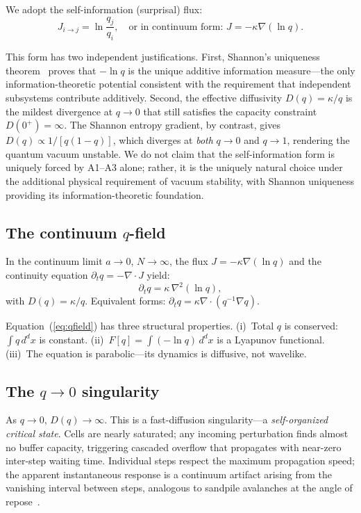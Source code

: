 \documentclass[12pt]{article}
\begin{document}
We adopt the self-information (surprisal) flux:
\begin{equation}
J_{i\to j} = \ln\frac{q_j}{q_i}, \quad \text{or in continuum form: } J = -\kappa\nabla(\ln q).
\end{equation}

This form has two independent justifications. First, Shannon's uniqueness theorem~\cite{Shannon1948} proves that $-\ln q$ is the unique additive information measure---the only information-theoretic potential consistent with the requirement that independent subsystems contribute additively. Second, the effective diffusivity $D(q)=\kappa/q$ is the mildest divergence at $q\to 0$ that still satisfies the capacity constraint $D(0^+)=\infty$. The Shannon entropy gradient, by contrast, gives $D(q)\propto 1/[q(1-q)]$, which diverges at \emph{both} $q\to 0$ and $q\to 1$, rendering the quantum vacuum unstable. We do not claim that the self-information form is uniquely forced by A1--A3 alone; rather, it is the uniquely natural choice under the additional physical requirement of vacuum stability, with Shannon uniqueness providing its information-theoretic foundation.

\subsection{The continuum $q$-field}

In the continuum limit $a\to 0$, $N\to\infty$, the flux $J=-\kappa\nabla(\ln q)$ and the continuity equation $\partial_t q = -\nabla\cdot J$ yield:
\begin{equation}
\boxed{\partial_t q = \kappa\,\nabla^2(\ln q)},
\label{eq:qfield}
\end{equation}
with $D(q)=\kappa/q$. Equivalent forms: $\partial_t q = \kappa\nabla\cdot(q^{-1}\nabla q)$.

Equation~(\ref{eq:qfield}) has three structural properties. (i)~Total $q$ is conserved: $\int q\,d^dx$ is constant. (ii)~$F[q]=\int(-\ln q)\,d^dx$ is a Lyapunov functional. (iii)~The equation is parabolic---its dynamics is diffusive, not wavelike.

\subsection{The $q\to 0$ singularity}

As $q\to 0$, $D(q)\to\infty$. This is a fast-diffusion singularity---a \emph{self-organized critical state}. Cells are nearly saturated; any incoming perturbation finds almost no buffer capacity, triggering cascaded overflow that propagates with near-zero inter-step waiting time. Individual steps respect the maximum propagation speed; the apparent instantaneous response is a continuum artifact arising from the vanishing interval between steps, analogous to sandpile avalanches at the angle of repose~\cite{Bak1987}.
\end{document}
